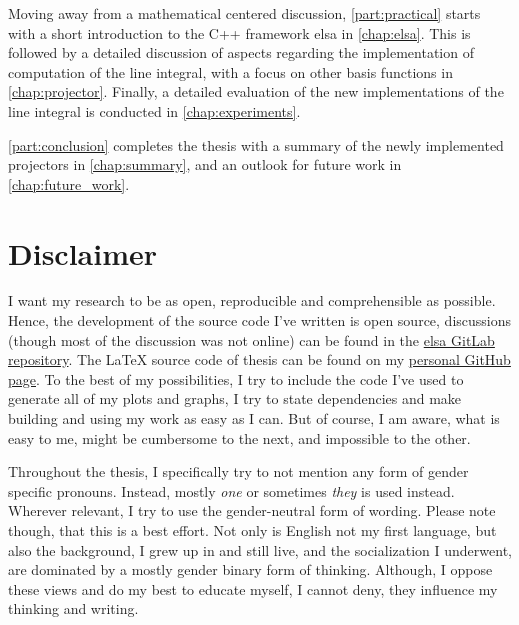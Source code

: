 Moving away from a mathematical centered discussion, \autoref{part:practical} starts with a short
introduction to the C++ framework elsa in \autoref{chap:elsa}. This is followed by a detailed
discussion of aspects regarding the implementation of computation of the line integral, with a focus
on other basis functions in \autoref{chap:projector}. Finally, a detailed evaluation of the new
implementations of the line integral is conducted in \autoref{chap:experiments}.

\autoref{part:conclusion} completes the thesis with a summary of the newly implemented projectors in
\autoref{chap:summary}, and an outlook for future work in \autoref{chap:future_work}.

\section{Disclaimer}\label{sec:disclaimer}

I want my research to be as open, reproducible and comprehensible as possible. Hence, the
development of the source code I've written is open source, discussions (though most of the
discussion was not online) can be found in the \href{https://gitlab.lrz.de/IP/elsa}{elsa GitLab
	repository}. The \LaTeX{} source code of thesis can be found on my
\href{https://github.com/ner0-m/ma-thesis-differential-basis-for-ct}{personal GitHub page}. To the
best of my possibilities, I try to include the code I've used to generate all of my plots and
graphs, I try to state dependencies and make building and using my work as easy as I can. But of
course, I am aware, what is easy to me, might be cumbersome to the next, and impossible to the
other.

Throughout the thesis, I specifically try to not mention any form of gender specific pronouns.
Instead, mostly \textit{one} or sometimes \textit{they} is used instead. Wherever relevant, I try to
use the gender-neutral form of wording. Please note though, that this is a best effort. Not only is
English not my first language, but also the background, I grew up in and still live, and the
socialization I underwent, are dominated by a mostly gender binary form of thinking. Although, I
oppose these views and do my best to educate myself, I cannot deny, they influence my thinking and
writing.
